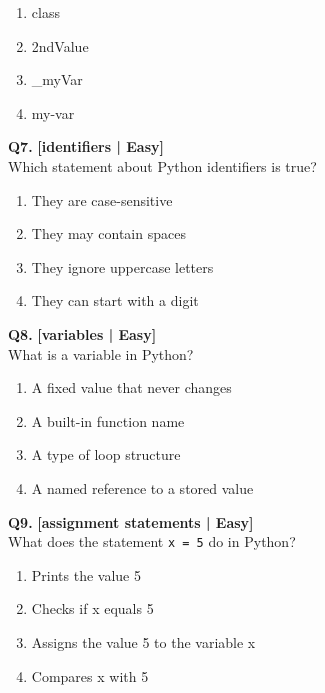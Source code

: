 \begin{enumerate}[label=(\alph*),topsep=2pt,itemsep=1pt,partopsep=0pt,parsep=0pt]
    \item \relax class
    \item \relax 2ndValue
    \item \relax \_myVar
    \item \relax my-var
\end{enumerate}
\vspace{2mm}

\noindent\textbf{Q7.} \hfill {\small\color{LPUOrange}\textbf{[identifiers | Easy]}}\\[2pt]
Which statement about Python identifiers is true?

\begin{enumerate}[label=(\alph*),topsep=2pt,itemsep=1pt,partopsep=0pt,parsep=0pt]
    \item \relax They are case-sensitive
    \item \relax They may contain spaces
    \item \relax They ignore uppercase letters
    \item \relax They can start with a digit
\end{enumerate}
\vspace{2mm}

\noindent\textbf{Q8.} \hfill {\small\color{LPUOrange}\textbf{[variables | Easy]}}\\[2pt]
What is a variable in Python?

\begin{enumerate}[label=(\alph*),topsep=2pt,itemsep=1pt,partopsep=0pt,parsep=0pt]
    \item \relax A fixed value that never changes
    \item \relax A built-in function name
    \item \relax A type of loop structure
    \item \relax A named reference to a stored value
\end{enumerate}
\vspace{2mm}

\noindent\textbf{Q9.} \hfill {\small\color{LPUOrange}\textbf{[assignment statements | Easy]}}\\[2pt]
What does the statement \texttt{x = 5} do in Python?

\begin{enumerate}[label=(\alph*),topsep=2pt,itemsep=1pt,partopsep=0pt,parsep=0pt]
    \item \relax Prints the value 5
    \item \relax Checks if x equals 5
    \item \relax Assigns the value 5 to the variable x
    \item \relax Compares x with 5
\end{enumerate}
\vspace{2mm}

